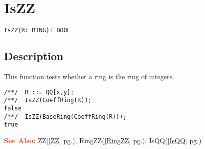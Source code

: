 \documentclass[a4paper]{mybook}
\newenvironment{command}{}{} %
\newcommand\SeeAlso{\par\textcolor{OrangeRed}{\textbf{\large See Also: }}}
\begin{document}
\section{IsZZ}
\label{IsZZ}
\begin{command} %


\begin{Verbatim}[label=syntax, rulecolor=\color{MidnightBlue},
frame=single]
IsZZ(R: RING): BOOL
\end{Verbatim}


\subsection*{Description}

This function tests whether a ring is the ring of integers.
\begin{Verbatim}[label=example, rulecolor=\color{PineGreen}, frame=single]
/**/  R ::= QQ[x,y];
/**/  IsZZ(CoeffRing(R));
false
/**/  IsZZ(BaseRing(CoeffRing(R)));
true
\end{Verbatim}


\SeeAlso %
  ZZ(\ref{ZZ} pg.\pageref{ZZ}), 
    RingZZ(\ref{RingZZ} pg.\pageref{RingZZ}), 
    IsQQ(\ref{IsQQ} pg.\pageref{IsQQ})
\end{command} %
\end{document}
